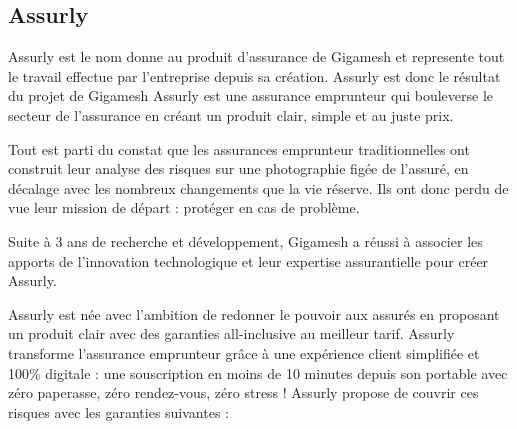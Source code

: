 \subsection{Assurly}
Assurly est le nom donne au produit d’assurance de Gigamesh et represente tout le travail effectue par
l’entreprise depuis sa création. Assurly est donc le résultat du projet de Gigamesh
Assurly est une assurance emprunteur qui bouleverse le secteur de l’assurance en créant un produit clair,
simple et au juste prix.

Tout est parti du constat que les assurances emprunteur traditionnelles ont construit leur analyse des risques sur une photographie figée de l’assuré, en décalage avec les nombreux changements que la vie réserve. Ils ont donc perdu de vue leur mission de départ : protéger en cas de problème.

Suite à 3 ans de recherche et développement, Gigamesh a réussi à associer les apports de l’innovation
technologique et leur expertise assurantielle pour créer Assurly.

Assurly est née avec l’ambition de redonner le pouvoir aux assurés en proposant un produit clair avec des
garanties all-inclusive au meilleur tarif. Assurly transforme l’assurance emprunteur grâce à une expérience client simplifiée et 100\% digitale : une souscription en moins de 10 minutes depuis son portable avec zéro paperasse, zéro rendez-vous, zéro stress !
Assurly propose de couvrir ces risques avec les garanties suivantes :

